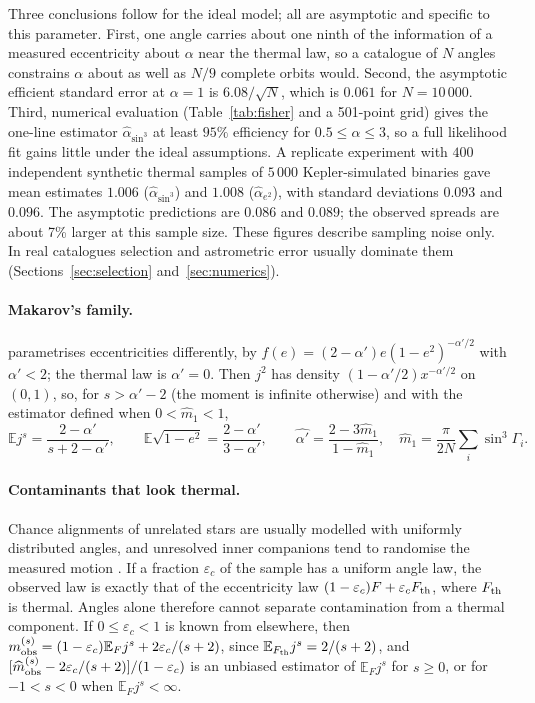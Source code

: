 \documentclass[11pt,a4paper]{article}
\theoremstyle{remark}\newtheorem{remark}[theorem]{Remark}
\newcommand{\E}{\mathbb E}
\begin{document}
Three conclusions follow for the ideal model; all are asymptotic and specific to this parameter. First, one angle carries about one ninth of the information of a measured eccentricity about $\alpha$ near the thermal law, so a catalogue of $N$ angles constrains $\alpha$ about as well as $N/9$ complete orbits would. Second, the asymptotic efficient standard error at $\alpha=1$ is $6.08/\sqrt N$, which is $0.061$ for $N=10\,000$. Third, numerical evaluation (Table~\ref{tab:fisher} and a 501-point grid) gives the one-line estimator $\widehat\alpha_{\sin^3}$ at least $95\%$ efficiency for $0.5\le\alpha\le3$, so a full likelihood fit gains little under the ideal assumptions. A replicate experiment with $400$ independent synthetic thermal samples of $5\,000$ Kepler-simulated binaries gave mean estimates $1.006$ ($\widehat\alpha_{\sin^3}$) and $1.008$ ($\widehat\alpha_{e^2}$), with standard deviations $0.093$ and $0.096$. The asymptotic predictions are $0.086$ and $0.089$; the observed spreads are about 7\% larger at this sample size. These figures describe sampling noise only. In real catalogues selection and astrometric error usually dominate them (Sections~\ref{sec:selection} and~\ref{sec:numerics}).

\paragraph{Makarov's family.} \citet{Makarov2025} parametrises eccentricities differently, by $f(e)=(2-\alpha')e(1-e^2)^{-\alpha'/2}$ with $\alpha'<2$; the thermal law is $\alpha'=0$. Then $j^2$ has density $(1-\alpha'/2)x^{-\alpha'/2}$ on $(0,1)$, so, for $s>\alpha'-2$ (the moment is infinite otherwise) and with the estimator defined when $0<\widehat m_1<1$,
\begin{equation}\label{eq:makarov}
\E j^{s}=\frac{2-\alpha'}{s+2-\alpha'},\qquad
\E\sqrt{1-e^2}=\frac{2-\alpha'}{3-\alpha'},\qquad
\widehat{\alpha'}=\frac{2-3\widehat m_1}{1-\widehat m_1},\quad \widehat m_1=\frac{\pi}{2N}\sum_i\sin^3\Gamma_i.
\end{equation}

\paragraph{Contaminants that look thermal.} Chance alignments of unrelated stars are usually modelled with uniformly distributed angles, and unresolved inner companions tend to randomise the measured motion \citep{Hwang2022}. If a fraction $\varepsilon_c$ of the sample has a uniform angle law, the observed law is exactly that of the eccentricity law $(1-\varepsilon_c)F+\varepsilon_c F_{\rm th}$, where $F_{\rm th}$ is thermal. Angles alone therefore cannot separate contamination from a thermal component. If $0\le\varepsilon_c<1$ is known from elsewhere, then $m^{(s)}_{\rm obs}=(1-\varepsilon_c)\E_Fj^s+2\varepsilon_c/(s+2)$, since $\E_{F_{\rm th}}j^s=2/(s+2)$, and $[\widehat m^{(s)}_{\rm obs}-2\varepsilon_c/(s+2)]/(1-\varepsilon_c)$ is an unbiased estimator of $\E_Fj^s$ for $s\ge0$, or for $-1<s<0$ when $\E_Fj^s<\infty$.
\end{document}
